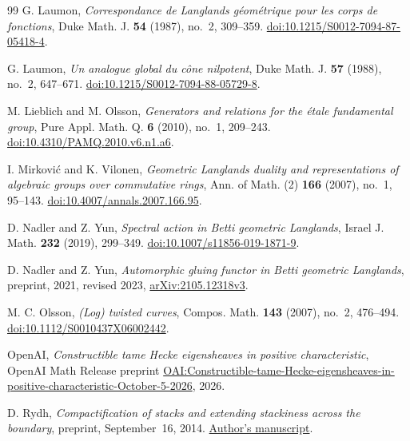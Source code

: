 \begin{thebibliography}{99}
G. Laumon, \emph{Correspondance de Langlands g\'eom\'etrique pour les
corps de fonctions}, Duke Math. J. \textbf{54} (1987), no.~2, 309--359.
\href{https://doi.org/10.1215/S0012-7094-87-05418-4}{doi:10.1215/S0012-7094-87-05418-4}.

G. Laumon, \emph{Un analogue global du c\^one nilpotent},
Duke Math. J. \textbf{57} (1988), no.~2, 647--671.
\href{https://doi.org/10.1215/S0012-7094-88-05729-8}{doi:10.1215/S0012-7094-88-05729-8}.

M. Lieblich and M. Olsson, \emph{Generators and relations for the
\'etale fundamental group}, Pure Appl. Math. Q. \textbf{6} (2010),
no.~1, 209--243.
\href{https://doi.org/10.4310/PAMQ.2010.v6.n1.a6}{doi:10.4310/PAMQ.2010.v6.n1.a6}.

I. Mirkovi\'c and K. Vilonen, \emph{Geometric Langlands duality and
representations of algebraic groups over commutative rings},
Ann. of Math. (2) \textbf{166} (2007), no.~1, 95--143.
\href{https://doi.org/10.4007/annals.2007.166.95}{doi:10.4007/annals.2007.166.95}.

D. Nadler and Z. Yun, \emph{Spectral action in Betti geometric
Langlands}, Israel J. Math. \textbf{232} (2019), 299--349.
\href{https://doi.org/10.1007/s11856-019-1871-9}{doi:10.1007/s11856-019-1871-9}.

D. Nadler and Z. Yun, \emph{Automorphic gluing functor in Betti
geometric Langlands}, preprint, 2021, revised 2023,
\href{https://arxiv.org/abs/2105.12318v3}{arXiv:2105.12318v3}.

M. C. Olsson, \emph{(Log) twisted curves},
Compos. Math. \textbf{143} (2007), no.~2, 476--494.
\href{https://doi.org/10.1112/S0010437X06002442}{doi:10.1112/S0010437X06002442}.

OpenAI, \emph{Constructible tame Hecke eigensheaves in positive
characteristic}, OpenAI Math Release preprint
\href{https://github.com/openai/math/blob/main/preprints/Constructible-tame-Hecke-eigensheaves-in-positive-characteristic-October-5-2026/constructible-tame-hecke-eigensheaves-positive-characteristic.pdf}{OAI:Constructible-tame-Hecke-eigensheaves-in-positive-characteristic-October-5-2026},
2026.

D. Rydh, \emph{Compactification of stacks and extending stackiness
across the boundary}, preprint, September~16, 2014.
\href{https://davidrydh.se/papers/compactification-survey20140916.pdf}{Author's manuscript}.


\end{thebibliography}
